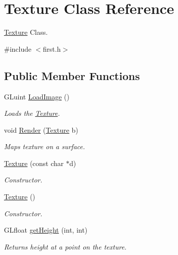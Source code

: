 \hypertarget{classTexture}{\section{\-Texture \-Class \-Reference}
\label{classTexture}
}


\hyperlink{classTexture}{\-Texture} \-Class.  




{\ttfamily \#include $<$first.\-h$>$}

\subsection*{\-Public \-Member \-Functions}
\begin{DoxyCompactItemize}
\item 
\-G\-Luint \hyperlink{classTexture_aa724f7918b3ef17cdba6f024ae44464d}{\-Load\-Image} ()
\begin{DoxyCompactList}\small\item\em \-Loads the \hyperlink{classTexture}{\-Texture}. \end{DoxyCompactList}\item 
void \hyperlink{classTexture_afd9faebeb8e143a319c64901c3270b4a}{\-Render} (\hyperlink{classTexture}{\-Texture} b)
\begin{DoxyCompactList}\small\item\em \-Maps texture on a surface. \end{DoxyCompactList}\item 
\hyperlink{classTexture_a824f9cf53cce18dd86d414156527c1bd}{\-Texture} (const char $\ast$d)
\begin{DoxyCompactList}\small\item\em \-Constructor. \end{DoxyCompactList}\item 
\hyperlink{classTexture_a6c275e3f186675ff6ed73ccf970e552f}{\-Texture} ()
\begin{DoxyCompactList}\small\item\em \-Constructor. \end{DoxyCompactList}\item 
\-G\-Lfloat \hyperlink{classTexture_a4feda287b0d9f5e6463c6c97b0fbf128}{get\-Height} (int, int)
\begin{DoxyCompactList}\small\item\em \-Returns height at a point on the texture. \end{DoxyCompactList}\end{DoxyCompactItemize}
